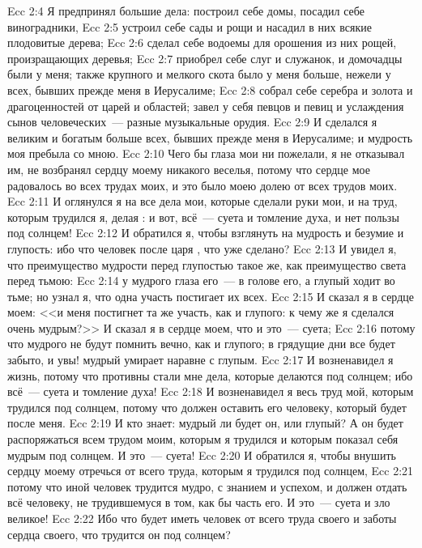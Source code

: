 \rsbpar\vs Ecc 2:4 Я предпринял большие дела: построил себе домы, посадил себе виноградники,
\vs Ecc 2:5 устроил себе сады и рощи и насадил в них всякие плодовитые дерева;
\vs Ecc 2:6 сделал себе водоемы для орошения из них рощей, произращающих деревья;
\vs Ecc 2:7 приобрел себе слуг и служанок, и домочадцы были у меня; также крупного и мелкого скота было у меня больше, нежели у всех, бывших прежде меня в Иерусалиме;
\vs Ecc 2:8 собрал себе серебра и золота и драгоценностей от царей и областей; завел у себя певцов и певиц и услаждения сынов человеческих~--- разные музыкальные орудия.
\vs Ecc 2:9 И сделался я великим и богатым больше всех, бывших прежде меня в Иерусалиме; и мудрость моя пребыла со мною.
\vs Ecc 2:10 Чего бы глаза мои ни пожелали, я не отказывал им, не возбранял сердцу моему никакого веселья, потому что сердце мое радовалось во всех трудах моих, и это было моею долею от всех трудов моих.
\vs Ecc 2:11 И оглянулся я на все дела мои, которые сделали руки мои, и на труд, которым трудился я, делая : и вот, всё~--- суета и томление духа, и нет  пользы под солнцем!
\rsbpar\vs Ecc 2:12 И обратился я, чтобы взглянуть на мудрость и безумие и глупость: ибо что  человек после царя , что уже сделано?
\vs Ecc 2:13 И увидел я, что преимущество мудрости перед глупостью такое же, как преимущество света перед тьмою:
\vs Ecc 2:14 у мудрого глаза его~--- в голове его, а глупый ходит во тьме; но узнал я, что одна участь постигает их всех.
\vs Ecc 2:15 И сказал я в сердце моем: <<и меня постигнет та же участь, как и глупого: к чему же я сделался очень мудрым?>> И сказал я в сердце моем, что и это~--- суета;
\vs Ecc 2:16 потому что мудрого не будут помнить вечно, как и глупого; в грядущие дни все будет забыто, и увы! мудрый умирает наравне с глупым.
\vs Ecc 2:17 И возненавидел я жизнь, потому что противны стали мне дела, которые делаются под солнцем; ибо всё~--- суета и томление духа!
\vs Ecc 2:18 И возненавидел я весь труд мой, которым трудился под солнцем, потому что должен оставить его человеку, который будет после меня.
\vs Ecc 2:19 И кто знает: мудрый ли будет он, или глупый? А он будет распоряжаться всем трудом моим, которым я трудился и которым показал себя мудрым под солнцем. И это~--- суета!
\vs Ecc 2:20 И обратился я, чтобы внушить сердцу моему отречься от всего труда, которым я трудился под солнцем,
\vs Ecc 2:21 потому что иной человек трудится мудро, с знанием и успехом, и должен отдать всё человеку, не трудившемуся в том, как бы часть его. И это~--- суета и зло великое!
\vs Ecc 2:22 Ибо что будет иметь человек от всего труда своего и заботы сердца своего, что трудится он под солнцем?
